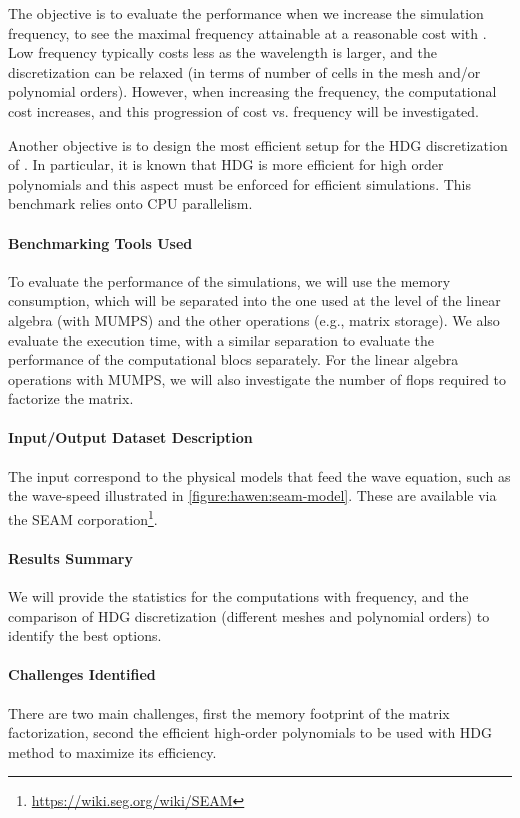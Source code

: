 The objective is to evaluate the performance when we increase the simulation frequency,
to see the maximal frequency attainable at a reasonable cost with \hawen.
Low frequency typically costs less as the wavelength is larger, and the discretization 
can be relaxed (in terms of number of cells in the mesh and/or polynomial orders).
However, when increasing the frequency, the computational cost increases, and this 
progression of cost vs. frequency will be investigated.

Another objective is to design the most efficient setup for the HDG discretization 
of \hawen. In particular, it is known that HDG is more efficient for high order 
polynomials and this aspect must be enforced for efficient simulations. This benchmark
relies onto CPU parallelism.


\paragraph{Benchmarking Tools Used}
To evaluate the performance of the simulations, we will use the memory consumption, 
which will be separated into the one used at the level of the linear algebra (with 
MUMPS) and the other operations (e.g., matrix storage). 
We also evaluate the execution time, with a similar separation to evaluate the 
performance of the computational blocs separately.
For the linear algebra operations with MUMPS, we will also investigate the number
of flops required to factorize the matrix.

\paragraph{Input/Output Dataset Description} The input correspond to the 
physical models that feed the wave equation, such as the wave-speed illustrated
in \cref{figure:hawen:seam-model}. These are available via the SEAM 
corporation\footnote{\url{https://wiki.seg.org/wiki/SEAM}}.

\paragraph{Results Summary}
We will provide the statistics for the computations with frequency, and 
the comparison of HDG discretization (different meshes and polynomial orders)
to identify the best options.

\paragraph{Challenges Identified} 
There are two main challenges, first the memory footprint of the matrix factorization,
second the efficient high-order polynomials to be used with HDG method to maximize its
efficiency.


